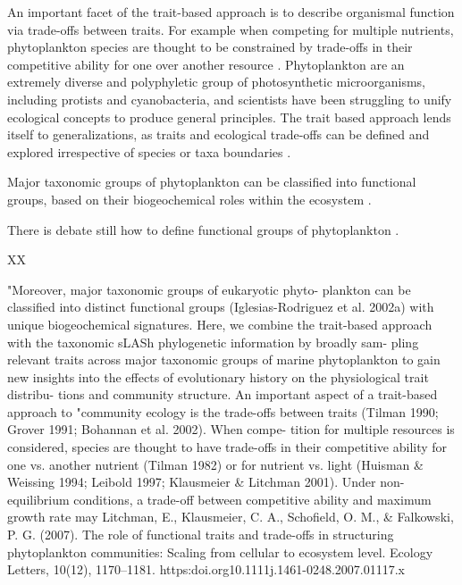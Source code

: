 An important facet of the trait-based approach is to describe organismal function via trade-offs between traits. For example when competing for multiple nutrients, phytoplankton species are thought to be constrained by trade-offs in their competitive ability for one over another resource \citep{Tilman1990}. Phytoplankton are an extremely diverse and polyphyletic group of photosynthetic microorganisms, including protists and cyanobacteria, and scientists have been struggling to unify ecological concepts to produce general principles. The trait based approach lends itself to generalizations, as traits and ecological trade-offs can be defined and explored irrespective of species or taxa boundaries \citep{McGill2006}.
 
Major taxonomic groups of phytoplankton can be classified into functional groups, based on their biogeochemical roles within the ecosystem \citep{Iglesias-Rodriguez2002}. 

There is debate still how to define functional groups of phytoplankton \citep{Flynn2015}.


XX



\citep{IrwinAndrewJ.Finkel2017b}


"Moreover, major taxonomic groups of eukaryotic phyto- plankton can be classified into distinct functional groups (Iglesias-Rodriguez et al. 2002a) with unique biogeochemical signatures. Here, we combine the trait-based approach with the taxonomic sLASh phylogenetic information by broadly sam- pling relevant traits across major taxonomic groups of marine phytoplankton to gain new insights into the effects of evolutionary history on the physiological trait distribu- tions and community structure. An important aspect of a trait-based approach to
"community ecology is the trade-offs between traits (Tilman 1990; Grover 1991; Bohannan et al. 2002). When compe- tition for multiple resources is considered, species are thought to have trade-offs in their competitive ability for one vs. another nutrient (Tilman 1982) or for nutrient vs. light (Huisman \& Weissing 1994; Leibold 1997; Klausmeier \& Litchman 2001). Under non-equilibrium conditions, a trade-off between competitive ability and maximum growth rate may
Litchman, E., Klausmeier, C. A., Schofield, O. M., \& Falkowski, P. G. (2007). The role of functional traits and trade-offs in structuring phytoplankton communities: Scaling from cellular to ecosystem level. Ecology Letters, 10(12), 1170–1181. https:doi.org10.1111j.1461-0248.2007.01117.x


